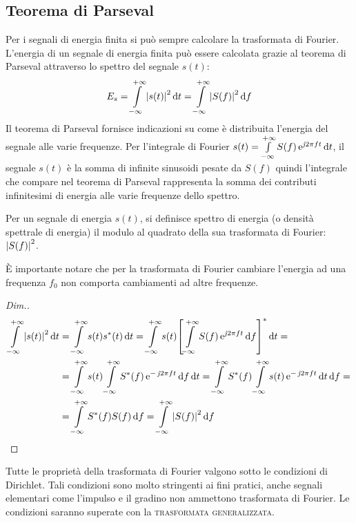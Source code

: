\subsection{Teorema di Parseval}
Per i segnali di energia finita si può sempre calcolare la trasformata di Fourier. L'energia di un segnale di energia finita può essere calcolata grazie al teorema di Parseval attraverso lo spettro del segnale $s(t)$:
\begin{equation}
\label{eq:parseval}
	E_s=\int\limits_{-\infty}^{+\infty}{\left|{s(t)}\right|^2}{\,\mathop{}\!\mathrm{d}{t}}=\int\limits_{-\infty}^{+\infty}{\left|{S(f)}\right|^2}{\,\mathop{}\!\mathrm{d}{f}}
\end{equation}
Il teorema di Parseval fornisce indicazioni su come è distribuita l'energia del segnale alle varie frequenze. Per l'integrale di Fourier $s(t)=\int\limits_{-\infty}^{+\infty}{S(f)\operatorname{e}^{\operatorname{\mathit{j}\!} 2\pi f t}}{\,\mathop{}\!\mathrm{d}{t}}$, il segnale $s(t)$ è la somma di infinite sinusoidi pesate da $S(f)$ quindi l'integrale che compare nel teorema di Parseval rappresenta la somma dei contributi infinitesimi di energia alle varie frequenze dello spettro.
\begin{nota}
	Per un segnale di energia $s(t)$, si definisce spettro di energia (o densità spettrale di energia) il modulo al quadrato della sua trasformata di Fourier: $\left|{S(f)}\right|^2$.
\end{nota}
\begin{nota}
	\`E importante notare che per la trasformata di Fourier cambiare l'energia ad una frequenza $f_0$ non comporta cambiamenti ad altre frequenze.
\end{nota}
\begin{proof}[Dim.]
\begin{align*}
	\intinf{\abs{s(t)}^2}{t}&=\intinf{s(t)\conj{s}(t)}{t}
	=\intinf{s(t)\conj{\left[\intinf{S(f)\e{\imath 2\pi f t}}{f}\right]}}{t}=\\
	&=\intinf{s(t)\intinf{\conj{S}(f)\e{-\imath 2\pi f t}}{f}}{t}=\intinf{\conj{S}(f)\intinf{s(t)\e{-\imath 2\pi f t}}{t}}{f}=\\
	&=\intinf{\conj{S}(f)S(f)}{f}=\intinf{\abs{S(f)}^2}{f}
\qedhere
\end{align*}
\end{proof}

\begin{nota}
	Tutte le proprietà della trasformata di Fourier valgono sotto le condizioni di Dirichlet. Tali condizioni sono molto stringenti ai fini pratici, anche segnali elementari come l'impulso e il gradino non ammettono trasformata di Fourier. Le condizioni saranno superate con la \textsc{trasformata generalizzata}. 
\end{nota}

